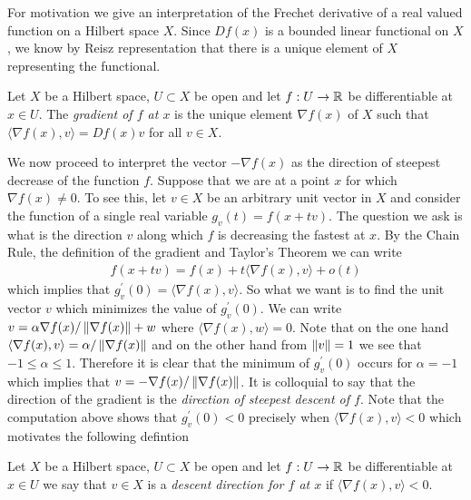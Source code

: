 For motivation we give an interpretation of the Frechet derivative of
a real valued function on a Hilbert space $X$.  Since $Df(x)$ is a
bounded linear functional on $X$, we know by Reisz
representation that there is a unique element of $X$ representing the
functional.

\begin{defn}Let $X$ be a Hilbert space, $U \subset X$ be open and let
  $f : U \to \mathbb{R}$ be differentiable at $x \in U$.  The
  \emph{gradient of $f$ at $x$} is the unique element $\nabla f(x)$ of
  $X$ such that $\langle \nabla f(x), v \rangle = Df(x) v$ for all $v
  \in X$.
\end{defn}

We now proceed to interpret the vector $-\nabla f(x)$ as the
direction of steepest decrease of the function $f$.  Suppose
that we are at a point $x$ for which $\nabla f(x) \neq 0$.  To see
this, let $v \in X$ be an arbitrary unit vector in $X$ and consider the function of a single
real variable $g_v(t) = f(x + tv)$.  The question we ask is what is the
direction $v$ along which $f$ is decreasing the fastest at $x$.  By the Chain Rule, the definition of the
gradient and Taylor's Theorem we can write
\begin{align*}
f(x + tv) = f(x) + t \langle \nabla f(x), v \rangle + o(t)
\end{align*}
which implies that $g_v^\prime(0) = \langle \nabla f(x), v \rangle$.  So
what we want is to find the unit vector $v$ which minimizes the value
of $g_v^\prime(0)$.  We can write $v = \alpha \nabla f(x)/\left \lVert \nabla
  f(x) \right \rVert + w$ where $\langle \nabla f(x), w \rangle = 0$.  Note that on
the one hand $\langle \nabla f(x), v \rangle = \alpha/\left \lVert \nabla
  f(x) \right \rVert$ and on the other hand from $\left \lVert v \right \rVert = 1$ we see that $-1
\leq \alpha \leq 1$.  Therefore it is clear that the minimum of
$g_v^\prime(0)$ occurs for $\alpha = -1$ which implies that $v = -
\nabla f(x) /\left \lVert \nabla f(x) \right \rVert$. It is colloquial to say that the direction of
the gradient is the \emph{direction of steepest descent of $f$}.  Note
that the computation above shows that $g_v^\prime(0) < 0$ precisely
when $\langle \nabla f(x), v \rangle < 0$ which motivates the
following defintion
\begin{defn}Let $X$ be a Hilbert space, $U \subset X$ be open and let
  $f : U \to \mathbb{R}$ be differentiable at $x \in U$ we say that $v \in
  X$ is a \emph{descent direction for $f$ at $x$} if $\langle \nabla
  f(x) , v\rangle < 0$.
\end{defn}


